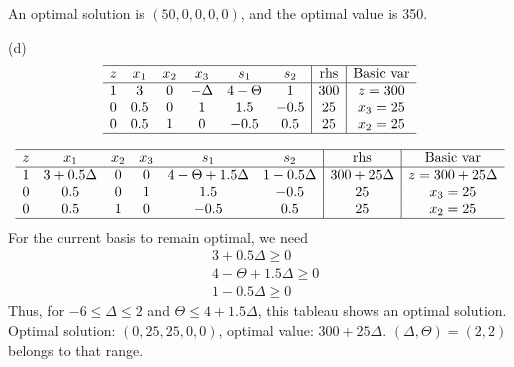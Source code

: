 \documentclass[12pt]{article}
\begin{document}
An optimal solution is $(50,0,0,0,0)$, and the optimal value is 350.

(d)
\begin{equation*}
  \begin{array}{cccccc|c|c}
    \hline
    z &  x_1      &  x_2 &  x_3 &  s_1 & s_2 &   \text{rhs} & \text{Basic var}   \\ \hline
    1 &    3     &    0 &    -\Delta &    4-\Theta & 1    & 300        &  z=300              \\
    0 &    0.5      &    0 &    1 &    1.5 &    -0.5 & 25        &  x_3 = 25         \\
    0 &    0.5      &    1 &    0 &    -0.5 &    0.5 & 25        &  x_2 = 25          \\ \hline
  \end{array}
\end{equation*}

\begin{equation*}
  \begin{array}{cccccc|c|c}
    \hline
    z &  x_1      &  x_2 &  x_3 &  s_1 & s_2 &   \text{rhs} & \text{Basic var}   \\ \hline
    1 &    3 +0.5\Delta     &    0 &    0 &    4-\Theta +1.5\Delta & 1-0.5\Delta    & 300 +25\Delta       &  z=300+25\Delta           \\
    0 &    0.5      &    0 &    1 &    1.5 &    -0.5 & 25        &  x_3 = 25         \\
    0 &    0.5      &    1 &    0 &    -0.5 &    0.5 & 25        &  x_2 = 25          \\ \hline
  \end{array}
\end{equation*}
For the current basis to remain optimal, we need
\begin{align*}
    & 3 +0.5\Delta \ge 0\\
    & 4-\Theta +1.5\Delta \ge 0 \\
    & 1-0.5\Delta \ge 0
\end{align*}
Thus, for $-6 \le \Delta \le 2$ and $\Theta \le 4+1.5\Delta$, this tableau shows an optimal solution. Optimal solution: $(0,25,25,0,0)$, optimal value: $300+25\Delta$. $(\Delta,\Theta) = (2,2)$ belongs to that range.
\end{document}
